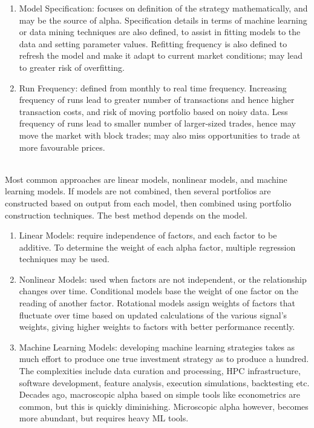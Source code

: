 \documentclass[a4paper,oneside,openany]{book}
\begin{document}
\begin{method}
\begin{enumerate}[label=\roman*.]
\item Model Specification: focuses on definition of the strategy mathematically, and may be the source of alpha. Specification details in terms of machine learning or data mining techniques are also defined, to assist in fitting models to the data and setting parameter values. Refitting frequency is also defined to refresh the model and make it adapt to current market conditions; may lead to greater risk of overfitting.
\item Run Frequency: defined from monthly to real time frequency. Increasing frequency of runs lead to greater number of transactions and hence higher transaction costs, and risk of moving portfolio based on noisy data. Less frequency of runs lead to smaller number of larger-sized trades, hence may move the market with block trades; may also miss opportunities to trade at more favourable prices.
\end{enumerate}
\end{method}

\begin{method} \\
Most common approaches are linear models, nonlinear models, and machine learning models. If models are not combined, then several portfolios are constructed based on output from each model, then combined using portfolio construction techniques. The best method depends on the model.
\begin{enumerate}[label=\roman*.]
\setlength{\itemsep}{0pt}
\item Linear Models: require independence of factors, and each factor to be additive. To determine the weight of each alpha factor, multiple regression techniques may be used.
\item Nonlinear Models: used when factors are not independent, or the relationship changes over time. Conditional models base the weight of one factor on the reading of another factor. Rotational models assign weights of factors that fluctuate over time based on updated calculations of the various signal's weights, giving higher weights to factors with better performance recently.
\item Machine Learning Models: developing machine learning strategies takes as much effort to produce one true investment strategy as to produce a hundred. The complexities include data curation and processing, HPC infrastructure, software development, feature analysis, execution simulations, backtesting etc.\\
Decades ago, macroscopic alpha based on simple tools like econometrics are common, but this is quickly diminishing. Microscopic alpha however, becomes more abundant, but requires heavy ML tools.
\end{enumerate}
\end{method}
\end{document}

